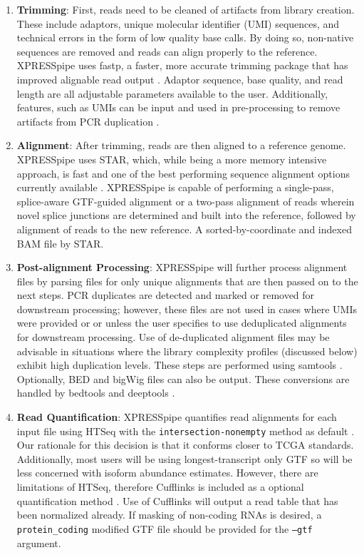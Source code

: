 \documentclass[11pt, a4paper, oneside]{article}
\begin{document}
\begin{enumerate}
  \item \textbf{Trimming}: First, reads need to be cleaned of artifacts from library creation. These include adaptors, unique molecular identifier (UMI) sequences, and technical errors in the form of low quality base calls. By doing so, non-native sequences are removed and reads can align properly to the reference. XPRESSpipe uses fastp, a faster, more accurate trimming package that has improved alignable read output \cite{fastp}. Adaptor sequence, base quality, and read length are all adjustable parameters available to the user. Additionally, features, such as UMIs can be input and used in pre-processing to remove artifacts from PCR duplication \cite{umi}.
  \item \textbf{Alignment}: After trimming, reads are then aligned to a reference genome. XPRESSpipe uses STAR, which, while being a more memory intensive approach, is fast and one of the  best performing sequence alignment options currently available \cite{star, baruzzo_natmeth}. XPRESSpipe is capable of performing a single-pass, splice-aware GTF-guided alignment or a two-pass alignment of reads wherein novel splice junctions are determined and built into the reference, followed by alignment of reads to the new reference. A sorted-by-coordinate and indexed BAM file by STAR.
  \item \textbf{Post-alignment Processing}: XPRESSpipe will further process alignment files by parsing files for only unique alignments that are then passed on to the next steps. PCR duplicates are detected and marked or removed for downstream processing; however, these files are not used in cases where UMIs were provided or or unless the user specifies to use deduplicated alignments for downstream processing. Use of de-duplicated alignment files may be advisable in situations where the library complexity profiles (discussed below) exhibit high duplication levels. These steps are performed using samtools \cite{samtools}. Optionally, BED and bigWig files can also be output. These conversions are handled by bedtools \cite{bedtools} and deeptools \cite{deeptools}.
  \item \textbf{Read Quantification}: XPRESSpipe quantifies read alignments for each input file using HTSeq with the \texttt{intersection-nonempty} method as default \cite{htseq, count_benchmark}. Our rationale for this decision is that it conforms closer to TCGA standards. Additionally, most users will be using longest-transcript only GTF so will be less concerned with isoform abundance estimates. However, there are limitations of HTSeq, therefore Cufflinks is included as a optional quantification method \cite{cufflinks, count_benchmark}. Use of Cufflinks will output a read table that has been normalized already. If masking of non-coding RNAs is desired, a \texttt{protein\_coding} modified GTF file should be provided for the \texttt{--gtf} argument.

\end{enumerate}
\end{document}
